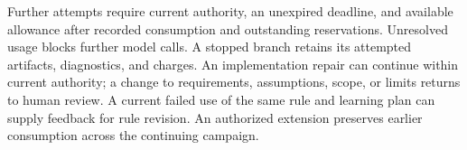 Further attempts require current authority, an unexpired deadline, and available allowance after recorded consumption and outstanding reservations. Unresolved usage blocks further model calls. A stopped branch retains its attempted artifacts, diagnostics, and charges. An implementation repair can continue within current authority; a change to requirements, assumptions, scope, or limits returns to human review. A current failed use of the same rule and learning plan can supply feedback for rule revision. An authorized extension preserves earlier consumption across the continuing campaign.

